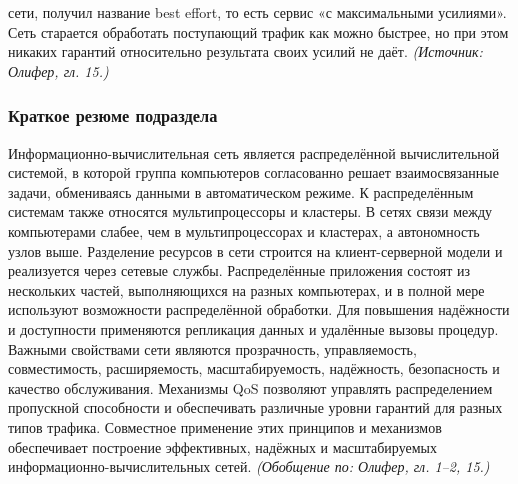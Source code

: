 \documentclass[a4paper,12pt]{article}
\begin{document}
сети, получил название best effort, то есть сервис «с максимальными усилиями». Сеть старается обработать поступающий трафик как можно быстрее, но при этом никаких гарантий относительно результата своих усилий не даёт.
\textit{(Источник: Олифер, гл. 15.)}

\subsubsection{Краткое резюме подраздела}
Информационно-вычислительная сеть является распределённой вычислительной системой, в которой группа компьютеров согласованно решает взаимосвязанные задачи, обмениваясь данными в автоматическом режиме. К распределённым системам также относятся мультипроцессоры и кластеры. В сетях связи между компьютерами слабее, чем в мультипроцессорах и кластерах, а автономность узлов выше. Разделение ресурсов в сети строится на клиент-серверной модели и реализуется через сетевые службы. Распределённые приложения состоят из нескольких частей, выполняющихся на разных компьютерах, и в полной мере используют возможности распределённой обработки. Для повышения надёжности и доступности применяются репликация данных и удалённые вызовы процедур. Важными свойствами сети являются прозрачность, управляемость, совместимость, расширяемость, масштабируемость, надёжность, безопасность и качество обслуживания. Механизмы QoS позволяют управлять распределением пропускной способности и обеспечивать различные уровни гарантий для разных типов трафика. Совместное применение этих принципов и механизмов обеспечивает построение эффективных, надёжных и масштабируемых информационно-вычислительных сетей.
\textit{(Обобщение по: Олифер, гл. 1–2, 15.)}
\end{document}
